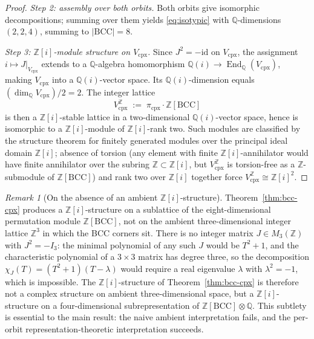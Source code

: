 \documentclass[11pt,reqno]{amsart}
\theoremstyle{plain}
\theoremstyle{definition}
\theoremstyle{remark}
\newtheorem{remark}[theorem]{Remark}
\numberwithin{equation}{section}
\newcommand{\End}{\operatorname{End}}
\newcommand{\BCC}{\mathrm{BCC}}
\newcommand{\Vcpx}{V_{\mathrm{cpx}}}
\begin{document}
\begin{proof}
\medskip

\textit{Step 2: assembly over both orbits.}
Both orbits give isomorphic decompositions; summing over them yields
\eqref{eq:isotypic} with $\mathbb{Q}$-dimensions
$(2, 2, 4)$, summing to $|\BCC| = 8$.

\medskip

\textit{Step 3: $\mathbb{Z}[i]$-module structure on $\Vcpx$.}
Since $J^{2} = -\mathrm{id}$ on $\Vcpx$, the assignment
$i \mapsto J|_{\Vcpx}$ extends to a $\mathbb{Q}$-algebra homomorphism
$\mathbb{Q}(i) \to \End_{\mathbb{Q}}(\Vcpx)$, making $\Vcpx$ into a
$\mathbb{Q}(i)$-vector space. Its $\mathbb{Q}(i)$-dimension equals
$(\dim_{\mathbb{Q}} \Vcpx)/2 = 2$. The integer lattice
\[
  \Vcpx^{\mathbb{Z}} \;:=\;
  \pi_{\mathrm{cpx}} \cdot \mathbb{Z}[\BCC]
\]
is then a $\mathbb{Z}[i]$-stable lattice in a two-dimensional
$\mathbb{Q}(i)$-vector space, hence is isomorphic to a
$\mathbb{Z}[i]$-module of $\mathbb{Z}[i]$-rank two. Such modules are
classified by the structure theorem for finitely generated modules
over the principal ideal domain $\mathbb{Z}[i]$; absence of torsion
(any element with finite $\mathbb{Z}[i]$-annihilator would have
finite annihilator over the subring $\mathbb{Z} \subset
\mathbb{Z}[i]$, but $\Vcpx^{\mathbb{Z}}$ is torsion-free as a
$\mathbb{Z}$-submodule of $\mathbb{Z}[\BCC]$) and rank two over
$\mathbb{Z}[i]$ together force
$\Vcpx^{\mathbb{Z}} \cong \mathbb{Z}[i]^{2}$.
\end{proof}

\begin{remark}[On the absence of an ambient {$\mathbb{Z}[i]$}-structure]
\label{rem:no-zi-on-z3}
Theorem~\ref{thm:bcc-cpx} produces a $\mathbb{Z}[i]$-structure on a
sublattice of the eight-dimensional permutation module $\mathbb{Z}
[\BCC]$, not on the ambient three-dimensional integer lattice
$\mathbb{Z}^{3}$ in which the BCC corners sit. There is no integer
matrix $J \in M_{3}(\mathbb{Z})$ with $J^{2} = -I_{3}$: the minimal
polynomial of any such $J$ would be $T^{2} + 1$, and the
characteristic polynomial of a $3 \times 3$ matrix has degree three,
so the decomposition $\chi_{J}(T) = (T^{2} + 1)(T - \lambda)$ would
require a real eigenvalue $\lambda$ with $\lambda^{2} = -1$, which
is impossible. The $\mathbb{Z}[i]$-structure of
Theorem~\ref{thm:bcc-cpx} is therefore not a complex structure on
ambient three-dimensional space, but a $\mathbb{Z}[i]$-structure on
a four-dimensional subrepresentation of $\mathbb{Z}[\BCC] \otimes
\mathbb{Q}$. This subtlety is essential to the main result: the
naive ambient interpretation fails, and the per-orbit
representation-theoretic interpretation succeeds.
\end{remark}
\end{document}
